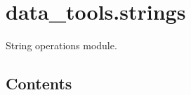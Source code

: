 \documentclass[letterpaper,10pt,english]{sphinxmanual}
\begin{document}
\begin{fulllineitems}
\begin{itemize}
\begin{description}
\end{description}

\end{itemize}

\end{fulllineitems}

\label{\detokenize{strings:module-data_tools.strings}}

\section{data\_tools.strings}
\label{\detokenize{strings:data-tools-strings}}\label{\detokenize{strings::doc}}
String operations module.


\subsection{Contents}
\label{\detokenize{strings:contents}}
\end{document}
